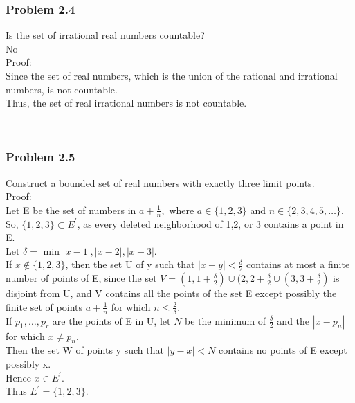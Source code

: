 \subsubsection*{Problem 2.4}
Is the set of irrational real numbers countable? \\ 
No\\ 
Proof:\\ 
Since the set of real numbers, which is the union of the rational and irrational numbers, is not countable. \\ 
Thus, the set of real irrational numbers is not countable. 
\begin{figure}[ht]\end{figure} 
\\
\newpage 
\subsubsection{Problem 2.5}
Construct a bounded set of real numbers with exactly three limit points. \\
Proof:\\ 
Let E be the set of numbers in $a+ \frac{1}{n},$ where $a \in \{1,2,3\}$ and $n \in \{2,3,4,5, \dots\}.$\\
So, $\{1,2,3\} \subset E^'$, as every deleted neighborhood of 1,2, or 3 contains a point in E.\\
 Let $\delta =$ min ${|x-1|,|x-2|,|x-3|}.$\\
 If $x \notin \{1,2,3\}$, then the set U of y such that $|x-y|< \frac{\delta}{2}$ contains at most a finite number of points of E, since the set $V=(1,1+\frac{\delta}{2}) \cup (2,2+\frac{\delta}{2} \cup (3,3+\frac{\delta}{2})$ is disjoint from U, and V contains all the points of the set E except possibly the finite set of points $a + \frac{1}{n}$ for which $n \leq \frac{2}{\delta}.$ \\
 If $p_1, \dots, p_r$ are the points of E in U, let $N$ be the minimum of $\frac{\delta}{2}$ and the $|x-p_n|$ for which $x \neq p_n.$ \\
 Then the set W of points y such that $|y-x|< N$ contains no points of E except possibly x. \\
 Hence $x \in E^'.$ \\
 Thus $E^{'}=\{1,2,3\}.$


